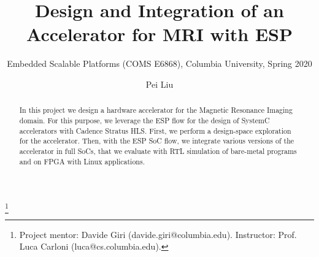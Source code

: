 \documentclass[sigconf, nonacm, screen]{acmart}
\begin{document}
\title{Design and Integration of an Accelerator for MRI with ESP}
\subtitle{Embedded Scalable Platforms (COMS E6868), Columbia University, Spring 2020}

\author{Pei Liu}
\thanks{Project mentor: Davide Giri (davide.giri@columbia.edu). Instructor:
  Prof. Luca Carloni (luca@cs.columbia.edu).}

\begin{abstract}
In this project we design a hardware accelerator for the Magnetic Resonance
Imaging domain. For this purpose, we leverage the ESP flow for the design of
SystemC accelerators with Cadence Stratus HLS. First, we perform a design-space
exploration for the accelerator. Then, with the ESP SoC flow, we integrate
various versions of the accelerator in full SoCs, that we evaluate with RTL
simulation of bare-metal programs and on FPGA with Linux applications.
\end{abstract}

\maketitle











\end{document}
